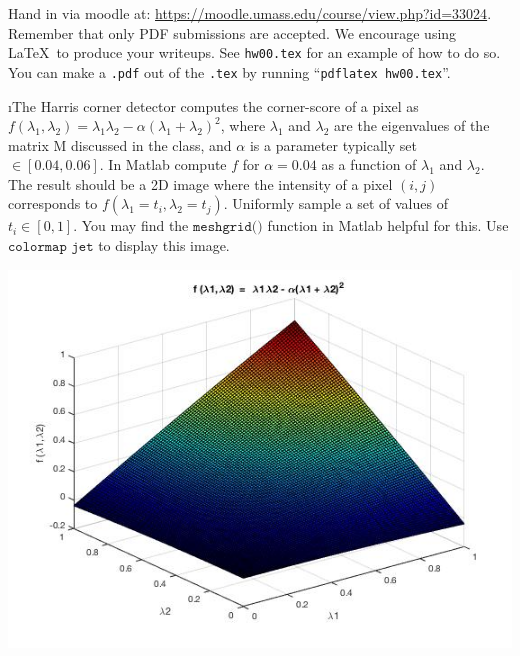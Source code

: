\documentclass[fleqn]{article}
\begin{document}


Hand in via moodle at: \url{https://moodle.umass.edu/course/view.php?id=33024}.
Remember that only PDF submissions are accepted.  We encourage using
\LaTeX\ to produce your writeups.  See \verb+hw00.tex+ for an example
of how to do so.  You can make a \verb+.pdf+ out of the \verb+.tex+ by
running ``\verb+pdflatex hw00.tex+''.



\bee
\i The Harris corner detector computes the corner-score of a pixel as $f(\lambda_1, \lambda_2) = \lambda_1\lambda_2 - \alpha(\lambda_1 + \lambda_2)^2$, where $\lambda_1$ and $\lambda_2$ are the eigenvalues of the matrix M discussed in the class, and $\alpha$ is a parameter typically set $\in[0.04,0.06]$. In Matlab compute $f$ for $\alpha=0.04$ as a function of $\lambda_1$ and $\lambda_2$. The result should be a 2D image where the intensity of a pixel $(i,j)$ corresponds to $f(\lambda_1 = t_i, \lambda_2 = t_j)$. Uniformly sample a set of values of $t_i \in [0,1]$. You may find the $\texttt{meshgrid()}$ function in Matlab helpful for this. Use $\texttt{colormap jet}$ to display this image.



 \includegraphics[width=1\textwidth]{old.jpg}
 
\newpage
\end{document}
